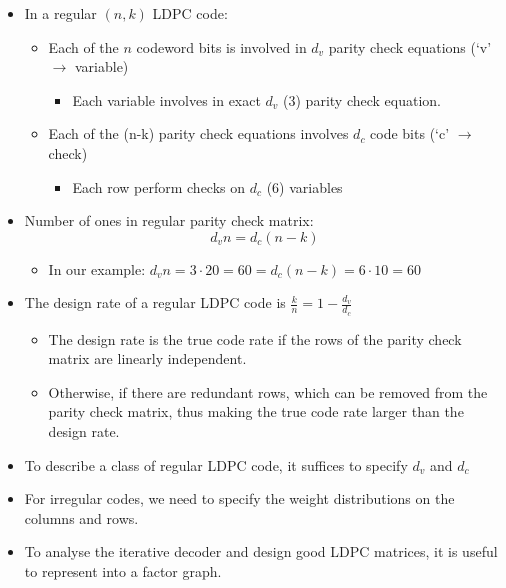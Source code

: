 \documentclass[12pt]{article}
\begin{document}
\begin{itemize}
    \item In a regular $(n,k)$ LDPC code:
    \begin{itemize}
        \item Each of the $n$ codeword bits is involved in $d_v$ parity check equations (`v' $\rightarrow$ variable)
        \begin{itemize}
            \item Each variable involves in exact $d_v$ (3) parity check equation. 
        \end{itemize}
        \item Each of the (n-k) parity check equations involves $d_c$ code bits (`c' $\rightarrow$ check)
        \begin{itemize}
            \item Each row perform checks on $d_c$ (6) variables
        \end{itemize}
    \end{itemize}
    \item Number of ones in regular parity check matrix:
    \[
    d_v n = d_c(n-k)
    \]
    \begin{itemize}
        \item In our example: $d_v n = 3 \cdot 20 = 60 = d_c(n-k) = 6 \cdot 10 = 60$
    \end{itemize}
    \item The design rate of a regular LDPC code is $\frac{k}{n} = 1 - \frac{d_v}{d_c}$
    \begin{itemize}
        \item The design rate is the true code rate if the rows of the parity check matrix are linearly independent.
        \item Otherwise, if there are redundant rows, which can be removed from the parity check matrix, thus making the true code rate larger than the design rate.
    \end{itemize}
    \item To describe a class of regular LDPC code, it suffices to specify $d_v$ and $d_c$
    \item For irregular codes, we need to specify the weight distributions on the columns and rows.
    \item To analyse the iterative decoder and design good LDPC matrices, it is useful to represent into a factor graph.
\end{itemize}
\end{document}
